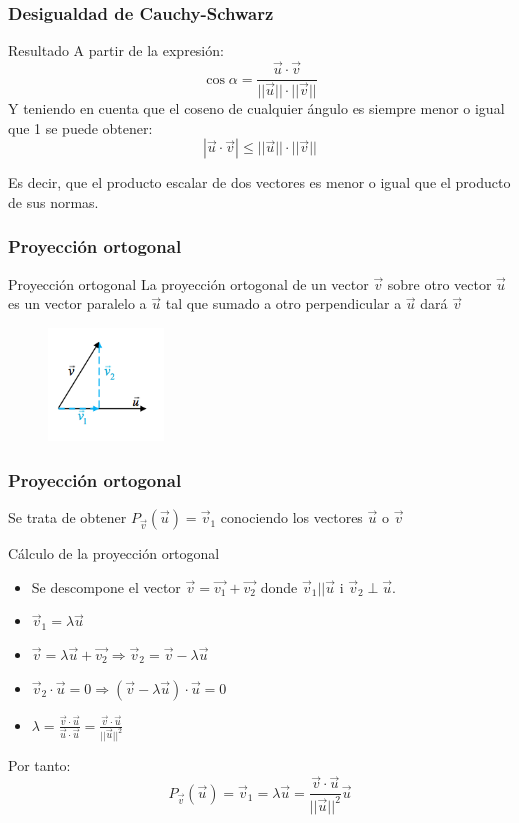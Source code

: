 \documentclass{beamer}
\begin{document}
\begin{frame}
  \frametitle{Desigualdad de Cauchy-Schwarz}
    \begin{block}{Resultado}
A partir de la expresi\'on:
\[\cos\alpha = \frac{\vec u \cdot \vec v} {||\vec u||\cdot|| \vec v||}\]
Y teniendo en cuenta que el coseno de cualquier \'angulo es siempre menor o igual que 1 se puede obtener:
\[|\vec u\cdot \vec v| \leq ||\vec u||\cdot ||\vec v||\]
  \end{block}
  
 Es decir, que el producto escalar de dos vectores es menor o igual que el producto de sus normas.
\end{frame}


\begin{frame}
  \frametitle{Proyecci\'on ortogonal}
    \begin{block}{Proyecci\'on ortogonal}
La proyecci\'on ortogonal de un vector $\vec v$ sobre otro vector $\vec u$ es un vector paralelo a $\vec u$ tal que sumado a otro perpendicular a $\vec u$ dar\'a $\vec v$ 
  \end{block}
  
\begin{figure}[h]
    \label{fig:ortogonal}
\centering
\includegraphics[height=3cm]{ortho}
\end{figure}
\end{frame}


\begin{frame}
  \frametitle{Proyecci\'on ortogonal}
  Se trata de obtener $P_{\vec v} (\vec u) = \vec v_1$ conociendo los vectores $\vec u$ o $\vec v$
    \begin{block}{C\'alculo de la proyecci\'on ortogonal}
\begin{itemize}
\item Se descompone el vector $\vec v = \vec{v_1}+\vec{v_2}$ donde $\vec v_1||\vec u$ i $\vec v_2 \perp \vec u$.
\item $\vec v_1 = \lambda \vec u$
\item $\vec v = \lambda \vec u + \vec{v_2}\Rightarrow \vec v_2 = \vec v - \lambda \vec u$
\item $\vec v_2\cdot \vec u = 0\Rightarrow (\vec v - \lambda \vec u)\cdot \vec u = 0$
\item $\lambda = \frac{\vec v\cdot \vec u}{\vec u\cdot \vec u} = \frac{\vec v\cdot \vec u}{||\vec u||^2}$
\end{itemize}
Por tanto:
\[P_{\vec v} (\vec u) = \vec v_1 = \lambda \vec u = \frac{\vec v\cdot \vec u}{||\vec u||^2} \vec u\]
  \end{block}
  
\end{frame}
\end{document}
